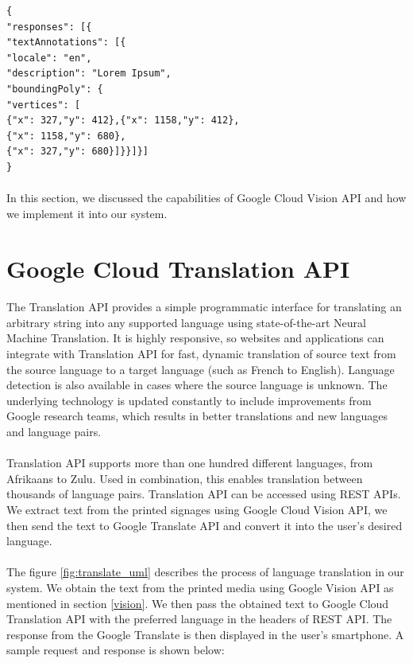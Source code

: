 \documentclass[12pt]{article}
\begin{document}
\begin{lstlisting}
{
"responses": [{
"textAnnotations": [{
"locale": "en",
"description": "Lorem Ipsum",
"boundingPoly": {
"vertices": [
{"x": 327,"y": 412},{"x": 1158,"y": 412},
{"x": 1158,"y": 680},
{"x": 327,"y": 680}]}}]}]
}
\end{lstlisting}

\paragraph{} In this section, we discussed the capabilities of Google Cloud Vision API and how we implement it into our system. 

\section{Google Cloud Translation API}

\paragraph{}The Translation API provides a simple programmatic interface for translating an arbitrary string into any supported language using state-of-the-art Neural Machine Translation. It is highly responsive, so websites and applications can integrate with Translation API for fast, dynamic translation of source text from the source language to a target language (such as French to English). Language detection is also available in cases where the source language is unknown. The underlying technology is updated constantly to include improvements from Google research teams, which results in better translations and new languages and language pairs.

\paragraph{}Translation API supports more than one hundred different languages, from Afrikaans to Zulu. Used in combination, this enables translation between thousands of language pairs. Translation API can be accessed using REST APIs. We extract text from the printed signages using Google Cloud Vision API, we then send the text to Google Translate API and convert it into the user's desired language.

\paragraph{}The figure \ref{fig:translate_uml} describes the process of language translation in our system. We obtain the text from the printed media using Google Vision API as mentioned in section \ref{vision}. We then pass the obtained text to Google Cloud Translation API with the preferred language in the headers of REST API. The response from the Google Translate is then displayed in the user's smartphone. A sample request and response is shown below:
\end{document}
